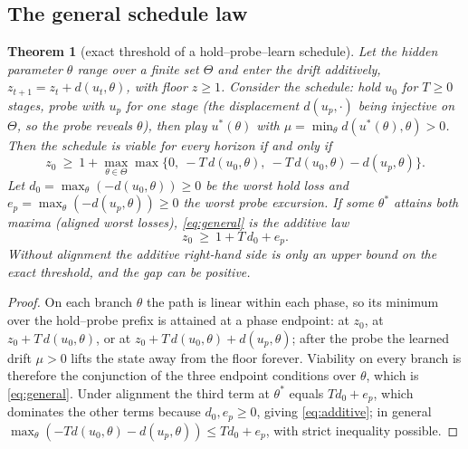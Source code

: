 \documentclass[11pt,a4paper]{article}
\theoremstyle{plain}
\newtheorem{theorem}{Theorem}[section]
\theoremstyle{definition}
\theoremstyle{remark}
\begin{document}
\subsection{The general schedule law}

\begin{theorem}[exact threshold of a hold--probe--learn schedule]\label{thm:additive}
Let the hidden parameter $\theta$ range over a finite set $\Theta$ and enter the drift additively, $z_{t+1}=z_t+d(u_t,\theta)$, with floor $z\ge1$. Consider the schedule: hold $u_0$ for $T\ge0$ stages, probe with $u_p$ for one stage (the displacement $d(u_p,\cdot)$ being injective on $\Theta$, so the probe reveals $\theta$), then play $u^{*}(\theta)$ with $\mu=\min_{\theta}d(u^{*}(\theta),\theta)>0$. Then the schedule is viable for every horizon if and only if
\begin{equation}\label{eq:general}
z_0\ \ge\ 1+\max_{\theta\in\Theta}\max\bigl\{0,\ -T\,d(u_0,\theta),\ -T\,d(u_0,\theta)-d(u_p,\theta)\bigr\}.
\end{equation}
Let $d_0=\max_\theta(-d(u_0,\theta))\ge0$ be the worst hold loss and $e_p=\max_\theta(-d(u_p,\theta))\ge0$ the worst probe excursion. If some $\theta^{*}$ attains both maxima (\emph{aligned worst losses}), \eqref{eq:general} is the additive law
\begin{equation}\label{eq:additive}
z_0\ \ge\ 1+T\,d_0+e_p .
\end{equation}
Without alignment the additive right-hand side is only an upper bound on the exact threshold, and the gap can be positive.
\end{theorem}

\begin{proof}
On each branch $\theta$ the path is linear within each phase, so its minimum over the hold--probe prefix is attained at a phase endpoint: at $z_0$, at $z_0+T\,d(u_0,\theta)$, or at $z_0+T\,d(u_0,\theta)+d(u_p,\theta)$; after the probe the learned drift $\mu>0$ lifts the state away from the floor forever. Viability on every branch is therefore the conjunction of the three endpoint conditions over $\theta$, which is \eqref{eq:general}. Under alignment the third term at $\theta^{*}$ equals $T d_0+e_p$, which dominates the other terms because $d_0,e_p\ge0$, giving \eqref{eq:additive}; in general $\max_\theta(-Td(u_0,\theta)-d(u_p,\theta))\le Td_0+e_p$, with strict inequality possible.
\end{proof}
\end{document}
